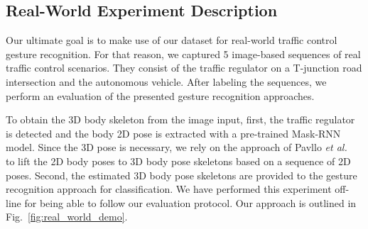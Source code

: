 \documentclass[letterpaper, 10 pt, conference]{ieeeconf}
\begin{document}
\subsection{Real-World Experiment Description}\label{realwroldDesc}

Our ultimate goal is to make use of our dataset for real-world traffic control gesture recognition. For that reason, we captured 5 image-based sequences of real traffic control scenarios. They consist of the traffic regulator on a T-junction road intersection and the autonomous vehicle. After labeling the sequences, we perform an evaluation of the presented gesture recognition approaches.

To obtain the 3D body skeleton from the image input, first, the traffic regulator is detected and the body 2D pose is extracted with a pre-trained Mask-RNN~\cite{He2017} model. Since the 3D pose is necessary, we rely on the approach of Pavllo \textit{et al.}~\cite{Pavllo20183DTraining} to lift the 2D body poses to 3D body pose skeletons based on a sequence of 2D poses. Second, the estimated 3D body pose skeletons are provided to the gesture recognition approach for classification. We have performed this experiment off-line for being able to follow our evaluation protocol. Our approach is outlined in Fig.~\ref{fig:real_world_demo}.
\end{document}
